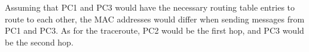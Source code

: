 Assuming that PC1 and PC3 would have the necessary routing table entries to route to each other, the MAC addresses would differ when sending messages from PC1 and PC3. As for the traceroute, PC2 would be the first hop, and PC3 would be the second hop. \\

